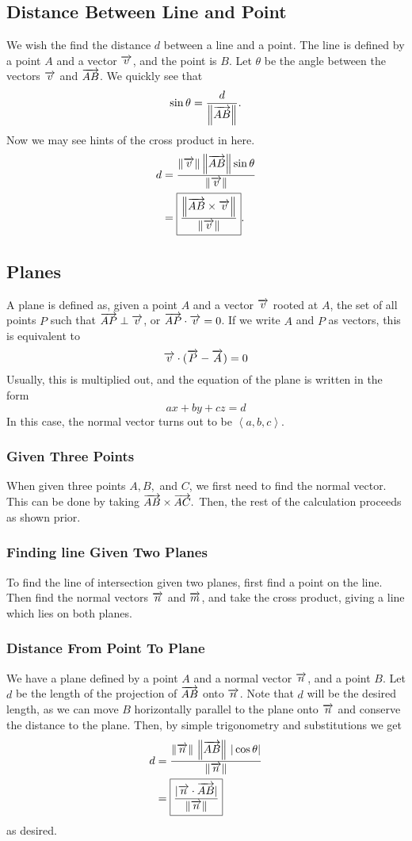 \documentclass[12pt]{article}
\theoremstyle{plain} %
\theoremstyle{definition}
\theoremstyle{definition}
\theoremstyle{remark}
\newcommand{\vecv}{\vv{v}}
\newcommand{\vecn}{\vv{n}}
\newcommand{\angled}[1]{\left\langle {#1} \right\rangle}
\newcommand*{\vv}[1]{\overrightarrow{\mkern0mu#1}}
\renewcommand{\norm}[1]{\left\lVert#1\right\rVert}
\begin{document}
\subsection{Distance Between Line and Point}
We wish the find the distance $d$ between a line and a point. The line is defined by a point $A$ and a vector $\vecv$, and the point is $B$. Let $\theta$ be the angle between the vectors $\vecv$ and $\vv{AB}$. We quickly see that
\[ \sin{\theta} = \frac{d}{\norm{\vv{AB}}} .\]
Now we may see hints of the cross product in here.
\begin{align*}
    d & = \frac{\norm{\vecv}\norm{\vv{AB}}\sin{\theta}}{\norm{\vecv}} \\
     & = \boxed{\frac{\norm{\vv{AB} \times \vecv}}{\norm{\vecv}}}.
\end{align*}

\subsection{Planes}
A plane is defined as, given a point $A$ and a vector $\vecv$ rooted at $A$, the set of all points $P$ such that $\vv{AP} \perp \vecv$, or $\vv{AP} \cdot \vecv = 0$. If we write $A$  and $P$ as vectors, this is equivalent to
\[ \vecv \cdot (\vv{P} - \vv{A}) = 0 \]
Usually, this is multiplied out, and the equation of the plane is written in the form
\[ ax + by + cz = d \]
In this case, the normal vector turns out to be $\angled{a,b,c}.$

\subsubsection{Given Three Points}
When given three points $A,B,$ and $C$, we first need to find the normal vector. This can be done by taking $\vv{AB} \times \vv{AC}.$ Then, the rest of the calculation proceeds as shown prior.

\subsubsection{Finding line Given Two Planes}
To find the line of intersection given two planes, first find a point on the line. Then find the normal vectors $\vv{n}$ and $\vv{m}$, and take the cross product, giving a line which lies on both planes.

\subsubsection{Distance From Point To Plane}
We have a plane defined by a point $A$ and a normal vector $\vv{n}$, and a point $B$. Let $d$ be the length of the projection of $\vv{AB}$ onto $\vv{n}$. Note that $d$ will be the desired length, as we can move $B$ horizontally parallel to the plane onto $\vecn$ and conserve the distance to the plane. Then, by simple trigonometry and substitutions we get
\begin{align*}
d & = \frac{\norm{\vecn} \, \norm{\vv{AB}} \, |\cos{\theta}|}{\norm{\vecn}} \\
& = \boxed{\frac{|\vecn \cdot \vv{AB}|}{\norm{\vecn}}}
\end{align*}
as desired.
\end{document}

